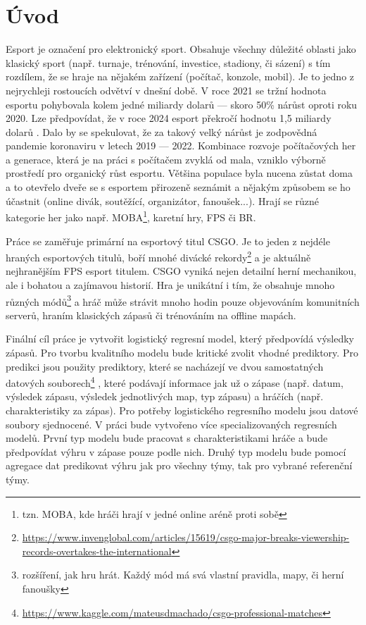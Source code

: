\chapter{Úvod}
Esport je označení pro elektronický sport. Obsahuje všechny důležité oblasti jako klasický sport (např. turnaje, trénování, investice, stadiony, či sázení)
s tím rozdílem, že se hraje na nějakém zařízení (počítač, konzole, mobil).
Je to jedno z nejrychleji rostoucích odvětví v dnešní době. V roce 2021 se tržní hodnota esportu pohybovala kolem jedné miliardy dolarů --- skoro
50\% nárůst oproti roku 2020. Lze předpovídat, že v roce 2024 esport překročí hodnotu 1,5 miliardy dolarů \cite{gough_global_2022}.
Dalo by se spekulovat, že za takový velký nárůst je zodpovědná 
pandemie koronaviru v letech 2019 --- 2022. Kombinace rozvoje počítačových her a generace, která je na práci s počítačem zvyklá od mala, vzniklo výborně prostředí
pro organický růst esportu. Většina populace byla nucena zůstat doma a to otevřelo dveře
se s esportem přirozeně seznámit a nějakým způsobem se ho účastnit (online divák, soutěžící, organizátor, fanoušek...). 
Hrají se různé kategorie her jako např. \ac{MOBA}\footnote{tzn. MOBA, kde hráči hrají v jedné online aréně proti sobě},
karetní hry, \ac{FPS} či \ac{BR}.

Práce se zaměřuje primární na esportový titul \acf{CSGO}. Je to jeden z nejdéle hraných esportových titulů, boří mnohé divácké
rekordy\footnote{\scriptsize \url{https://www.invenglobal.com/articles/15619/csgo-major-breaks-viewership-records-overtakes-the-international}}
a je aktuálně nejhranějším \ac{FPS} esport titulem. \ac{CSGO} vyniká nejen detailní herní mechanikou, ale i bohatou a zajímavou historií. Hra
je unikátní i tím, že obsahuje mnoho různých módů\footnote{rozšíření, jak hru hrát. Každý mód má svá vlastní pravidla, mapy, či herní fanoušky}
a hráč může strávit mnoho hodin pouze objevováním komunitních serverů, hraním klasických zápasů či trénováním na offline mapách.

Finální cíl práce je vytvořit logistický regresní model, který předpovídá výsledky zápasů. Pro tvorbu kvalitního modelu bude kritické zvolit vhodné prediktory.
Pro predikci jsou použity prediktory, které se nacházejí ve dvou samostatných datových souborech\footnote{\url{https://www.kaggle.com/mateusdmachado/csgo-professional-matches}} 
, které podávají informace jak už o zápase (např. datum, výsledek zápasu, výsledek jednotlivých map, typ zápasu) a hráčích 
(např. charakteristiky za zápas). Pro potřeby logistického regresního modelu jsou datové soubory sjednocené.
V práci bude vytvořeno více specializovaných regresních modelů. První typ modelu bude pracovat s charakteristikami hráče a bude předpovídat výhru v zápase pouze podle nich.
Druhý typ modelu bude pomocí agregace dat predikovat výhru jak pro všechny týmy, tak pro vybrané referenční týmy.

